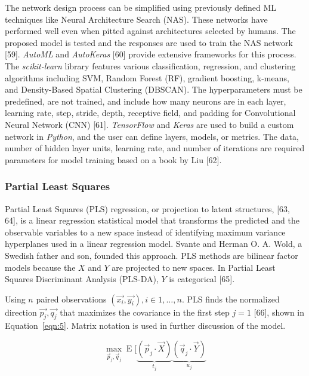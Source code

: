 \documentclass[sn-mathphys-num]{sn-jnl}%
\begin{document}
The network design process can be simplified using previously defined ML techniques like Neural Architecture Search (NAS). These networks have performed well even when pitted against architectures selected by humans. The proposed model is tested and the responses are used to train the NAS network [59]. \textit{AutoML} and \textit{AutoKeras} [60] provide extensive frameworks for this process. The \textit{scikit-learn} library features various classification, regression, and clustering algorithms including SVM, Random Forest (RF), gradient boosting, k-means, and Density-Based Spatial Clustering (DBSCAN). The hyperparameters must be predefined, are not trained, and include how many neurons are in each layer, learning rate, step, stride, depth, receptive field, and padding for Convolutional Neural Network (CNN) [61]. \textit{TensorFlow} and \textit{Keras} are used to build a custom network in \textit{Python}, and the user can define layers, models, or metrics. The data, number of hidden layer units, learning rate, and number of iterations are required parameters for model training based on a book by Liu [62].

\subsubsection{Partial Least Squares}

Partial Least Squares (PLS) regression, or projection to latent structures, [63, 64], is a linear regression statistical model that transforms the predicted and the observable variables to a new space instead of identifying maximum variance hyperplanes used in a linear regression model. Svante and Herman O. A. Wold, a Swedish father and son, founded this approach. PLS methods are bilinear factor models because the $X$ and $Y$ are projected to new spaces. In Partial Least Squares Discriminant Analysis (PLS-DA), $Y$ is categorical [65].

Using $n$ paired observations $\left(\vec{x_{i}}, \vec{y_{i}}\right), i \in 1, \dots, n$. PLS finds the normalized direction $\vec{p_{j}}, \vec{q_{j}}$ that maximizes the covariance in the first step $j = 1$ [66], shown in Equation~\ref{eqn:5}. Matrix notation is used in further discussion of the model.

\begin{equation}
	\max_{{\vec{p}}_{j},{\vec{q}}_{j}}\operatorname{E} [\underbrace{({\vec{p}}_{j}\cdot {\vec{X}})}_{t_{j}}\underbrace{({\vec{q}}_{j}\cdot {\vec{Y}})}_{u_{j}}
	\label{eqn:5}
\end{equation}
\end{document}
